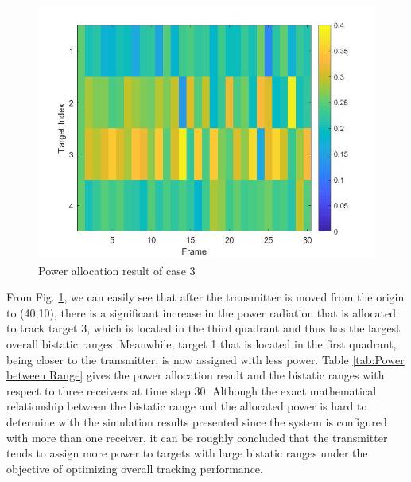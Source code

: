 \documentclass[12pt,journal,draftclsnofoot,onecolumn]{IEEEtran}
\begin{document}
\begin{figure}
	\centering
	\includegraphics[scale=0.36]{Power3.jpg}
	\caption{Power allocation result of case 3}
	\label{fig:Power 3}
\end{figure}



From Fig. \ref{fig:Power 3}, we can easily see that after the transmitter is moved from the origin to (40,10), there is a significant increase in the power radiation that is allocated to track target 3, which is located in the third quadrant %
 and thus has the largest overall bistatic ranges. Meanwhile, target 1 that is located in the first quadrant, being closer to the transmitter, is now assigned with less power. Table \ref{tab:Power between Range} gives the power allocation result and the bistatic ranges with respect to three receivers at time step 30. Although the exact mathematical relationship between the bistatic range and the allocated power is hard to determine with the simulation results presented since the system is configured with more than one receiver, it can be roughly concluded that the transmitter tends to assign more power to targets with large bistatic ranges under the objective of optimizing overall tracking performance.
\end{document}
